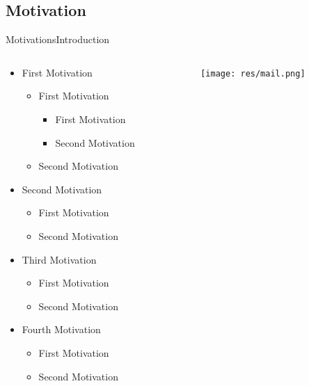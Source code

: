 

\subsection*{Motivation}
\begin{frame}{Motivations}{Introduction} %
	\begin{columns}
		\begin{column}{0.5\textwidth}
					\begin{itemize}
				\item First Motivation
					\begin{itemize}
						\item First Motivation
						\begin{itemize}
							\item First Motivation
							\item Second Motivation
						\end{itemize}
						\item Second Motivation
					\end{itemize}
				\item Second Motivation
					\begin{itemize}
						\item First Motivation
						\item Second Motivation
					\end{itemize}
				\item Third Motivation
					\begin{itemize}
						\item First Motivation
						\item Second Motivation
					\end{itemize}
				\item Fourth Motivation
					\begin{itemize}
						\item First Motivation
						\item Second Motivation
					\end{itemize}
				\end{itemize}
							\end{column}
					\begin{column}{0.5\textwidth}
				\begin{center}
									\begin{figure}
						\texttt{[image: res/mail.png]}
						\caption{\label{fig:}}
					\end{figure}

\end{center}
\end{column}
\end{columns}
\end{frame}

